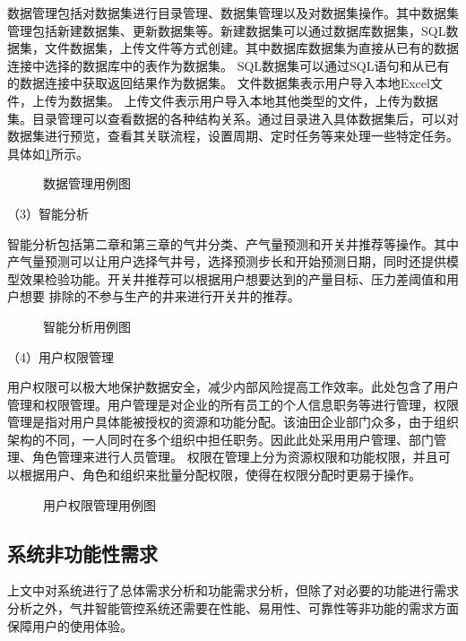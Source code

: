 数据管理包括对数据集进行目录管理、数据集管理以及对数据集操作。其中数据集管理包括新建数据集、更新数据集等。新建数据集可以通过数据库数据集，SQL数据集，文件数据集，上传文件等方式创建。其中数据库数据集为直接从已有的数据连接中选择的数据库中的表作为数据集。
SQL数据集可以通过SQL语句和从已有的数据连接中获取返回结果作为数据集。
文件数据集表示用户导入本地Excel文件，上传为数据集。
上传文件表示用户导入本地其他类型的文件，上传为数据集。目录管理可以查看数据的各种结构关系。通过目录进入具体数据集后，可以对数据集进行预览，查看其关联流程，设置周期、定时任务等来处理一些特定任务。具体如\ref{fig:datamaucase}所示。
\begin{figure}[H]
    \centering
    \caption{数据管理用例图}
    
    \label{fig:datamaucase}
\end{figure}

（3）智能分析

智能分析包括第二章和第三章的气井分类、产气量预测和开关井推荐等操作。其中产气量预测可以让用户选择气井号，选择预测步长和开始预测日期，同时还提供模型效果检验功能。开关井推荐可以根据用户想要达到的产量目标、压力差阈值和用户想要
排除的不参与生产的井来进行开关井的推荐。
\begin{figure}[H]
    \centering
    \caption{智能分析用例图}
    
    \label{fig:analyusecase}
\end{figure}


（4）用户权限管理

用户权限可以极大地保护数据安全，减少内部风险提高工作效率。此处包含了用户管理和权限管理。用户管理是对企业的所有员工的个人信息职务等进行管理，权限管理是指对用户具体能被授权的资源和功能分配。该油田企业部门众多，由于组织架构的不同，一人同时在多个组织中担任职务。因此此处采用用户管理、部门管理、角色管理来进行人员管理。
权限在管理上分为资源权限和功能权限，并且可以根据用户、角色和组织来批量分配权限，使得在权限分配时更易于操作。
\begin{figure}[H]
    \centering
    \caption{用户权限管理用例图}
    
\end{figure}
\subsection{系统非功能性需求}
上文中对系统进行了总体需求分析和功能需求分析，但除了对必要的功能进行需求分析之外，气井智能管控系统还需要在性能、易用性、可靠性等非功能的需求方面保障用户的使用体验。


